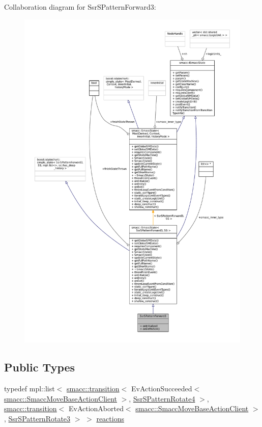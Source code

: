 Collaboration diagram for Ssr\+S\+Pattern\+Forward3\+:
\nopagebreak
\begin{figure}[H]
\begin{center}
\leavevmode
\includegraphics[width=350pt]{structSsrSPatternForward3__coll__graph}
\end{center}
\end{figure}
\subsection*{Public Types}
\begin{DoxyCompactItemize}
\item 
typedef mpl\+::list$<$ \hyperlink{classsmacc_1_1transition}{smacc\+::transition}$<$ Ev\+Action\+Succeeded$<$ \hyperlink{classsmacc_1_1SmaccMoveBaseActionClient}{smacc\+::\+Smacc\+Move\+Base\+Action\+Client} $>$, \hyperlink{structSsrSPatternRotate4}{Ssr\+S\+Pattern\+Rotate4} $>$, \hyperlink{classsmacc_1_1transition}{smacc\+::transition}$<$ Ev\+Action\+Aborted$<$ \hyperlink{classsmacc_1_1SmaccMoveBaseActionClient}{smacc\+::\+Smacc\+Move\+Base\+Action\+Client} $>$, \hyperlink{structSsrSPatternRotate3}{Ssr\+S\+Pattern\+Rotate3} $>$ $>$ \hyperlink{structSsrSPatternForward3_a8328e936a0e30e6a11f4cc33d909d997}{reactions}
\end{DoxyCompactItemize}
